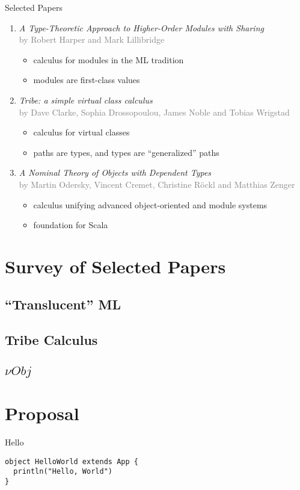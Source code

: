 \documentclass{beamer}
\begin{document}
\begin{frame}{Selected Papers}
\begin{enumerate}
\item {\it A Type-Theoretic Approach to Higher-Order
  Modules with Sharing}\\{\footnotesize\textcolor{gray}{by Robert Harper and Mark
  Lillibridge}}\begin{itemize}
\item calculus for modules in the ML tradition
\item modules are first-class values
\end{itemize}
\item {\it Tribe: a simple virtual class calculus}\\
  {\footnotesize\textcolor{gray}{by Dave Clarke, Sophia Drossopoulou, James Noble and Tobias Wrigstad}}\begin{itemize}
\item calculus for virtual classes
\item paths are types, and types are ``generalized'' paths
\end{itemize}
\item {\it A Nominal Theory of Objects with Dependent
  Types}\\{\footnotesize\textcolor{gray}{by Martin Odersky, Vincent Cremet, Christine R{\"o}ckl and
  Matthias Zenger}}\begin{itemize}
\item calculus unifying advanced object-oriented and module systems
\item foundation for Scala
\end{itemize}
\end{enumerate}
\end{frame}

\section{Survey of Selected Papers}

\subsection{``Translucent'' ML}

\subsection{Tribe Calculus}

\subsection{${\nu}Obj$}

\section{Proposal}

\begin{frame}[fragile]{Hello}
\begin{verbatim}
object HelloWorld extends App {
  println("Hello, World")
}
\end{verbatim}
\end{frame}
\end{document}
